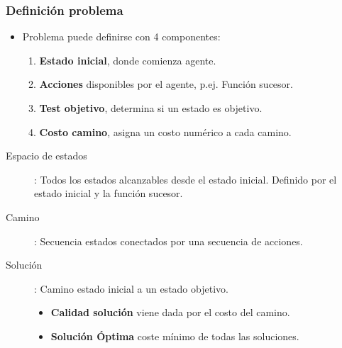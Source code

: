 \documentclass{beamer}
\begin{document}

\begin{frame} \frametitle{Definición problema} \footnotesize

\begin{itemize}
\item Problema puede definirse con 4 componentes:

\begin{enumerate}
\item \textbf{Estado inicial}, donde comienza agente.
\item \textbf{Acciones} disponibles por el agente, p.ej. Función sucesor.
\item \textbf{Test objetivo}, determina si un estado es objetivo. 
\item \textbf{Costo camino},  asigna un costo numérico a cada camino.
\end{enumerate}


\end{itemize}

\begin{description}
\item[Espacio de estados]: Todos los estados alcanzables desde el estado inicial. Definido por el estado inicial y la función sucesor.
\item[Camino] : Secuencia estados conectados por una secuencia de acciones.
\item[Solución] : Camino estado inicial a un estado objetivo.
\begin{itemize}
\item \textbf{Calidad solución} viene dada por el costo del camino.
\item \textbf{Solución Óptima} coste mínimo de todas las soluciones.
\end{itemize}

\end{description}


\end{frame} 

\end{document}
